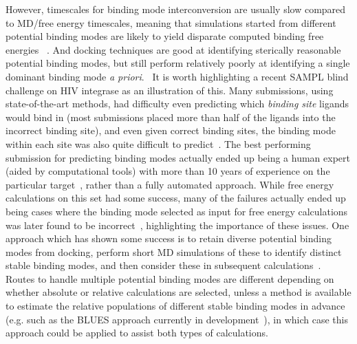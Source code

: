 \documentclass[9pt,bestpractices]{livecoms}
\begin{document}
However, timescales for binding mode interconversion are usually slow compared to MD/free energy timescales, meaning that simulations started from different potential binding modes are likely to yield disparate computed binding free energies~\cite{mobley2006use, palma2012computation, mobley2012perspective, gill2018binding} .
And docking techniques are good at identifying sterically reasonable potential binding modes, but still perform relatively poorly at identifying a single dominant binding mode \emph{a priori}.~\cite{} 
%
It is worth highlighting a recent SAMPL blind challenge on HIV integrase as an illustration of this. 
Many submissions, using state-of-the-art methods, had difficulty even predicting which \emph{binding site} ligands would bind in (most submissions placed more than half of the ligands into the incorrect binding site), and even given correct binding sites, the binding mode within each site was also quite difficult to predict~\cite{mobley2014blind}.
The best performing submission for predicting binding modes actually ended up being a human expert (aided by computational tools) with more than 10 years of experience on the particular target~\cite{voet2014combining}, rather than a fully automated approach.
While free energy calculations on this set had some success, many of the failures actually ended up being cases where the binding mode selected as input for free energy calculations was later found to be incorrect~\cite{gallicchio2014virtual}, highlighting the importance of these issues.
%
One approach which has shown some success is to retain diverse potential binding modes from docking, perform short MD simulations of these to identify distinct stable binding modes, and then consider these in subsequent calculations~\cite{gallicchio2014virtual, mobley2006use,rocklin2013blind, boyce2009predicting, mobley2007predicting}.
%
Routes to handle multiple potential binding modes are different depending on whether absolute or relative calculations are selected, unless a method is available to estimate the relative populations of different stable binding modes in advance (e.g. such as the BLUES approach currently in development~\cite{gill2018binding}), in which case this approach could be applied to assist both types of calculations.
%
\end{document}
